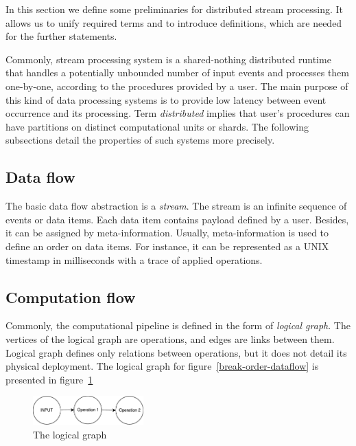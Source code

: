 
\label {fs-stream}

In this section we define some preliminaries for distributed stream processing. It allows us to unify required terms and to introduce definitions, which are needed for the further statements.

Commonly, stream processing system is a shared-nothing distributed runtime that handles a potentially unbounded number of input events and processes them one-by-one, according to the procedures provided by a user. The main purpose of this kind of data processing systems is to provide low latency between event occurrence and its processing. Term {\it distributed} implies that user's procedures can have partitions on distinct computational units or shards. The following subsections detail the properties of such systems more precisely.  

\subsection{Data flow}
The basic data flow abstraction is a {\it stream}. The stream is an infinite sequence of events or data items. Each data item contains payload defined by a user. Besides, it can be assigned by meta-information. Usually, meta-information is used to define an order on data items. For instance, it can be represented as a UNIX timestamp in milliseconds with a trace of applied operations.

\subsection{Computation flow}
Commonly, the computational pipeline is defined in the form of {\it logical graph}. The vertices of the logical graph are operations, and edges are links between them. Logical graph defines only relations between operations, but it does not detail its physical deployment. The logical graph for figure~\ref{break-order-dataflow} is presented in figure~\ref{break-order-dataflow-logical}

\begin{figure}[htbp]
  \centering
  \includegraphics[width=0.38\textwidth]{pics/break_order_pipeline_logical}
  \caption{The logical graph}
  \label {break-order-dataflow-logical}
\end{figure}

